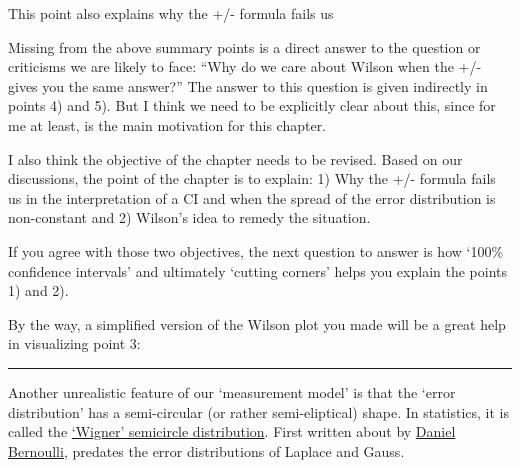 \documentclass[]{book}
\begin{document}
This point also explains why the +/- formula fails us

Missing from the above summary points is a direct answer to the question or criticisms we are likely to face: ``Why do we care about Wilson when the +/- gives you the same answer?''
The answer to this question is given indirectly in points 4) and 5). But I think we need to be explicitly clear about this, since for me at least, is the main motivation for this chapter.

I also think the objective of the chapter needs to be revised. Based on our discussions, the point of the chapter is to explain:
1) Why the +/- formula fails us in the interpretation of a CI and when the spread of the error distribution is non-constant and
2) Wilson's idea to remedy the situation.

If you agree with those two objectives, the next question to answer is how `100\% confidence intervals' and ultimately `cutting corners' helps you explain the points 1) and 2).

By the way, a simplified version of the Wilson plot you made will be a great help in visualizing point 3:

\begin{center}\rule{0.5\linewidth}{\linethickness}\end{center}

Another unrealistic feature of our `measurement model' is that the `error distribution' has a semi-circular (or rather semi-eliptical) shape. In statistics, it is called the \href{https://en.wikipedia.org/wiki/Wigner_semicircle_distribution}{`Wigner' semicircle distribution}. First written about by \href{http://www.medicine.mcgill.ca/epidemiology/hanley/bios601/Likelihood/Kendall1961OnDanielBernoulliML.pdf}{Daniel Bernoulli}, predates the error distributions of Laplace and Gauss.
\end{document}
